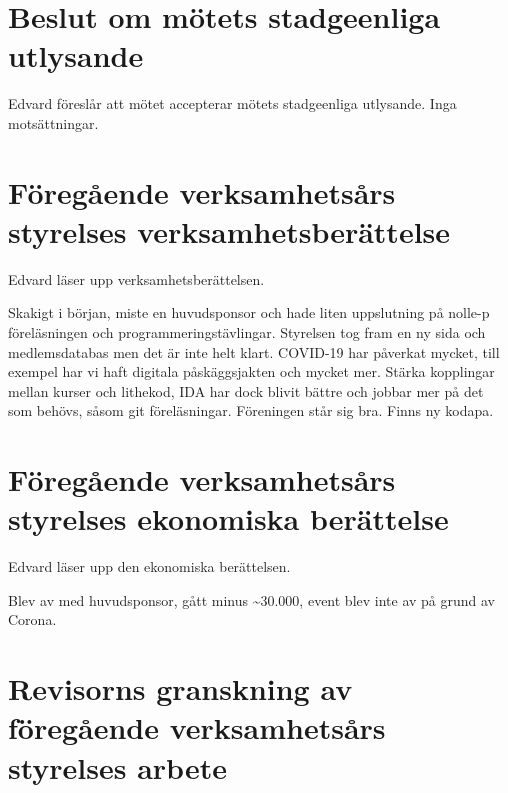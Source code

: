 \documentclass[a4paper]{article}
\begin{document}
\hypertarget{beslut-om-muxf6tets-stadgeenliga-utlysande}{%
\section{Beslut om mötets stadgeenliga
utlysande}\label{beslut-om-muxf6tets-stadgeenliga-utlysande}}

Edvard föreslår att mötet accepterar mötets stadgeenliga utlysande. Inga
motsättningar.

\hypertarget{fuxf6reguxe5ende-verksamhetsuxe5rs-styrelses-verksamhetsberuxe4ttelse}{%
\section{Föregående verksamhetsårs styrelses
verksamhetsberättelse}\label{fuxf6reguxe5ende-verksamhetsuxe5rs-styrelses-verksamhetsberuxe4ttelse}}

Edvard läser upp verksamhetsberättelsen.

\begin{displayquote}
  Skakigt i början, miste en huvudsponsor och hade liten uppslutning på nolle-p
  föreläsningen och programmeringstävlingar. Styrelsen tog fram en ny sida och
  medlemsdatabas men det är inte helt klart. COVID-19 har påverkat mycket, till
  exempel har vi haft digitala påskäggsjakten och mycket mer.  Stärka kopplingar
  mellan kurser och lithekod, IDA har dock blivit bättre och jobbar mer på det
  som behövs, såsom git föreläsningar. Föreningen står sig bra. Finns ny kodapa.
\end{displayquote}

\hypertarget{fuxf6reguxe5ende-verksamhetsuxe5rs-styrelses-ekonomiska-beruxe4ttelse}{%
\section{Föregående verksamhetsårs styrelses ekonomiska
berättelse}\label{fuxf6reguxe5ende-verksamhetsuxe5rs-styrelses-ekonomiska-beruxe4ttelse}}

Edvard läser upp den ekonomiska berättelsen.

\begin{displayquote}
  Blev av med huvudsponsor, gått minus \textasciitilde{}30.000, event blev inte
  av på grund av Corona.
\end{displayquote}

\hypertarget{revisorns-granskning-av-fuxf6reguxe5ende-verksamhetsuxe5rs-styrelses-arbete}{%
\section{Revisorns granskning av föregående verksamhetsårs styrelses
arbete}\label{revisorns-granskning-av-fuxf6reguxe5ende-verksamhetsuxe5rs-styrelses-arbete}}
\end{document}
